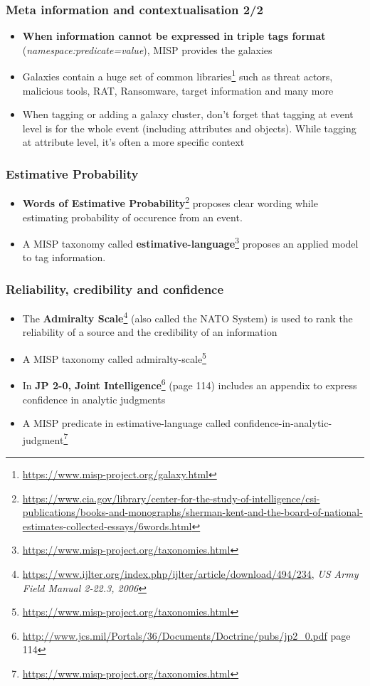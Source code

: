 \begin{frame}
\frametitle{Meta information and contextualisation 2/2}
\begin{itemize}
        \item {\bf When information cannot be expressed in triple tags format} ({\it namespace:predicate=value}), MISP provides the galaxies
        \item Galaxies contain a huge set of common libraries\footnote{\url{https://www.misp-project.org/galaxy.html}} such as threat actors, malicious tools, RAT, Ransomware, target information and many more
        \item When tagging or adding a galaxy cluster, don't forget that tagging at event level is for the whole event (including attributes and objects). While tagging at attribute level, it's often a more specific context
\end{itemize}
\end{frame}

\begin{frame}
        \frametitle{Estimative Probability}
\begin{itemize}
        \item {\bf Words of Estimative Probability}\footnote{\url{https://www.cia.gov/library/center-for-the-study-of-intelligence/csi-publications/books-and-monographs/sherman-kent-and-the-board-of-national-estimates-collected-essays/6words.html}} proposes clear wording while estimating probability of occurence from an event.
        \item A MISP taxonomy called {\bf estimative-language}\footnote{\url{https://www.misp-project.org/taxonomies.html}} proposes an applied model to tag information.
\end{itemize}
\end{frame}

\begin{frame}
        \frametitle{Reliability, credibility and confidence}
\begin{itemize}
        \item The {\bf Admiralty Scale}\footnote{\url{https://www.ijlter.org/index.php/ijlter/article/download/494/234}, {\it US Army Field Manual 2-22.3, 2006}} (also called the NATO System) is used to rank the reliability of a source and the credibility of an information
        \item A MISP taxonomy called admiralty-scale\footnote{\url{https://www.misp-project.org/taxonomies.html}}
        \item In {\bf JP 2-0, Joint Intelligence}\footnote{\url{http://www.jcs.mil/Portals/36/Documents/Doctrine/pubs/jp2\_0.pdf} page 114} (page 114) includes an appendix to express confidence in analytic judgments
        \item A MISP predicate in estimative-language called confidence-in-analytic-judgment\footnote{\url{https://www.misp-project.org/taxonomies.html}}
\end{itemize}
\end{frame}


